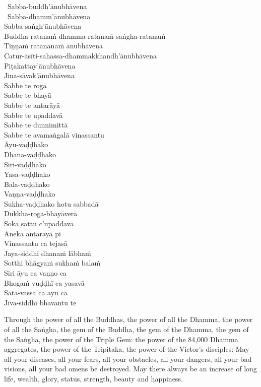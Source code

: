 \begin{pali-hang}
  \anglebracketleft\ \hspace{-0.5mm}Sabba-buddh'ānubhāvena \hspace{-0.5mm}\anglebracketright\\\
  Sabba-dhamm'ānubhāvena\\
  Sabba-saṅgh'ānubhāvena\\
  Buddha-ratanaṁ dhamma-ratanaṁ saṅgha-ratanaṁ\\
  Tiṇṇaṁ ratanānaṁ ānubhāvena\\
  Catur-āsīti-sahassa-dhammakkhandh'ānubhāvena\\
  Piṭakattay'ānubhāvena\\
  Jina-sāvak'ānubhāvena\\
  Sabbe te rogā\\
  Sabbe te bhayā\\
  Sabbe te antarāyā\\
  Sabbe te upaddavā\\
  Sabbe te dunnimittā\\
  Sabbe te avamaṅgalā vinassantu\\
  Āyu-vaḍḍhako\\
  Dhana-vaḍḍhako\\
  Siri-vaḍḍhako\\
  Yasa-vaḍḍhako\\
  Bala-vaḍḍhako\\
  Vaṇṇa-vaḍḍhako\\
  Sukha-vaḍḍhako hotu sabbadā\\
  Dukkha-roga-bhayāverā\\
  Sokā sattu c'upaddavā\\
  Anekā antarāyā pi\\
  Vinassantu ca tejasā\\
  Jaya-siddhi dhanaṁ lābhaṁ\\
  Sotthi bhāgyaṁ sukhaṁ balaṁ\\
  Siri āyu ca vaṇṇo ca\\
  Bhogaṁ vuḍḍhī ca yasavā\\
  Sata-vassā ca āyū ca\\
  Jīva-siddhī bhavantu te
\end{pali-hang}

\begin{english-verses}
  Through the power of all the Buddhas, the power of all the Dhamma, the power of all the Saṅgha, the gem of the Buddha, the gem of the Dhamma, the gem of the Saṅgha, the power of the Triple Gem: the power of the 84,000 Dhamma aggregates, the power of the Tripitaka, the power of the Victor's disciples: May all your diseases, all your fears, all your obstacles, all your dangers, all your bad visions, all your bad omens be destroyed. May there always be an increase of long life, wealth, glory, status, strength, beauty and happiness.
\end{english-verses}

